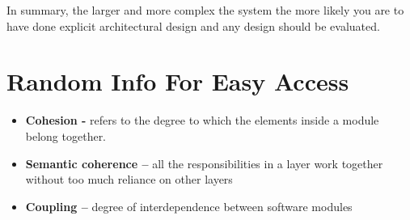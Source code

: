 \documentclass[a4paper]{article}
\begin{document}
In summary, the	larger and	more complex the system the more likely you are to have done explicit architectural design and any design should be evaluated.
 

\section{Random Info For Easy Access}
\begin{itemize}
\item \textbf{Cohesion -} refers to the degree to which the elements inside a module belong together.

\item \textbf{Semantic coherence –} all the responsibilities in a layer work together without too much reliance on other layers

\item \textbf{Coupling –} degree of interdependence between software modules
\end{itemize}
\end{document}
